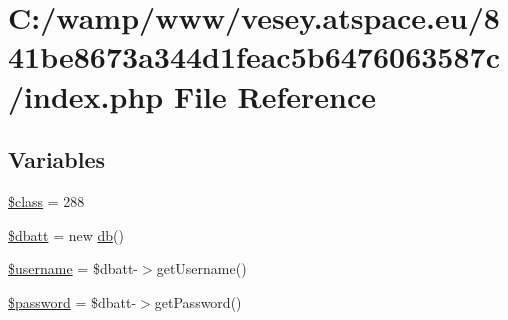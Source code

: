 \hypertarget{841be8673a344d1feac5b6476063587c_2index_8php}{\section{C\-:/wamp/www/vesey.atspace.\-eu/841be8673a344d1feac5b6476063587c/index.php File Reference}
\label{841be8673a344d1feac5b6476063587c_2index_8php}
}
\subsection*{Variables}
\begin{DoxyCompactItemize}
\item 
\hyperlink{841be8673a344d1feac5b6476063587c_2index_8php_a252ba022809910ea710a068fc1bab657}{\$class} = 288
\item 
\hyperlink{841be8673a344d1feac5b6476063587c_2index_8php_a91a28d35770d3a47412dce6c8059f374}{\$dbatt} = new \hyperlink{classdb}{db}()
\item 
\hyperlink{841be8673a344d1feac5b6476063587c_2index_8php_a0eb82aa5f81cf845de4b36cd653c42cf}{\$username} = \$dbatt-\/$>$get\-Username()
\item 
\hyperlink{841be8673a344d1feac5b6476063587c_2index_8php_a607686ef9f99ea7c42f4f3dd3dbb2b0d}{\$password} = \$dbatt-\/$>$get\-Password()
\end{DoxyCompactItemize}


